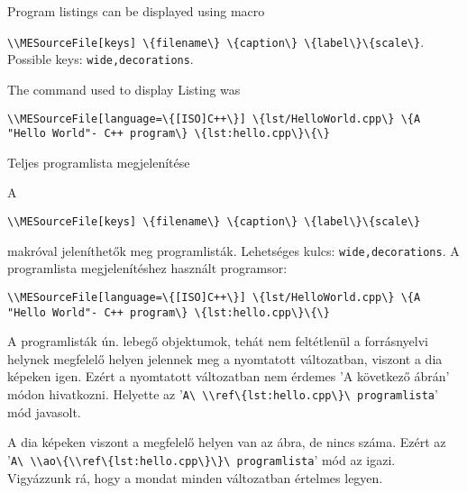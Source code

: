 
{

Program listings can be displayed using macro
\par\noindent\lstinline|\\MESourceFile[keys] \{filename\} \{caption\} \{label\}\{scale\}|.
Possible keys: \lstinline|wide,decorations|.


\par\noindent The command used to display Listing\ao{~\ref{lst:hello.cpp}} was
\par\noindent\lstinline|\\MESourceFile[language=\{[ISO]C++\}] \{lst/HelloWorld.cpp\} \{A "Hello World"- C++ program\} \{lst:hello.cpp\}\{\}|

}
{Teljes programlista megjelenítése}
{
A
\par\noindent\lstinline|\\MESourceFile[keys] \{filename\} \{caption\} \{label\}\{scale\}|
\par\noindent makróval jeleníthetők meg programlisták.
Lehetséges kulcs: \lstinline|wide,decorations|.
A \ao{\ref{lst:hello.cpp}} programlista megjelenítéshez használt programsor:
\par\noindent\lstinline|\\MESourceFile[language=\{[ISO]C++\}] \{lst/HelloWorld.cpp\} \{A "Hello World"- C++ program\} \{lst:hello.cpp\}\{\}|



A programlisták ún. lebegő objektumok, tehát nem feltétlenül a forrásnyelvi helynek 
megfelelő helyen jelennek meg a nyomtatott változatban, viszont a dia képeken igen.
Ezért a nyomtatott változatban nem érdemes 'A következő ábrán' módon hivatkozni. Helyette
az '\lstinline|A\ \\ref\{lst:hello.cpp\}\ programlista|' mód javasolt.

A dia képeken viszont  a megfelelő helyen van az ábra, de nincs száma.
Ezért az '\lstinline|A\ \\ao\{\\ref\{lst:hello.cpp\}\}\ programlista|' mód az igazi.
Vigyázzunk rá, hogy a mondat minden változatban értelmes legyen.
}

